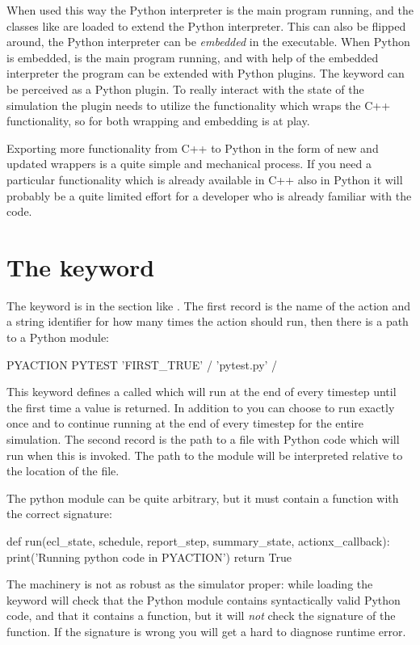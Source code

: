 When used this way the Python interpreter is the main program running, and the
\flow{} classes like  are loaded to extend the Python
interpreter. This can also be flipped around, the Python interpreter can be
\emph{embedded} in the \flow{} executable. When Python is embedded, \flow{} is
the main program running, and with help of the embedded interpreter the \flow{}
program can be extended with Python plugins. The \pyaction{} keyword can be
perceived as a Python plugin. To really interact with the state of the \flow{}
simulation the plugin needs to utilize the functionality which wraps the C++
functionality, so for \pyaction{} both wrapping and embedding is at play.

Exporting more functionality from C++ to Python in the form of new and updated
wrappers is a quite simple and mechanical process. If you need a particular
functionality which is already available in C++ also in Python it will probably
be a quite limited effort for a developer who is already familiar with the code.


\section{The \pyaction{} keyword}
The \pyaction{} keyword is in the  section like \actionx{}. The
first record is the name of the action and a string identifier for how many
times the action should run, then there is a path to a Python module:

\begin{deck}
PYACTION
  PYTEST 'FIRST_TRUE' /
  'pytest.py' /
\end{deck}

This keyword defines a \pyaction{} called  which will run at the end
of every timestep until the first time a  value is returned. In
addition to  you can choose  to run exactly once and
 to continue running at the end of every timestep for the entire
simulation. The second record is the path to a file with Python code which will
run when this \pyaction{} is invoked. The path to the module will be interpreted
relative to the location of the  file.

The python module can be quite arbitrary, but it must contain a function
 with the correct signature:
\begin{code}
def run(ecl_state, schedule, report_step, summary_state, actionx_callback):
    print('Running python code in PYACTION')
    return True
\end{code}
The \pyaction{} machinery is not as robust as the simulator proper: while
loading the  keyword \flow{} will check that the Python module
contains syntactically valid Python code, and that it contains a
 function, but it will \emph{not} check the signature of the
 function. If the signature is wrong you will get a hard to
diagnose runtime error.

